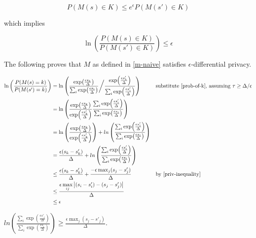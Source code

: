 \documentclass{article}
\begin{document}
\begin{equation}
    P(M(s) \in K) \leq e^\epsilon P(M(s') \in K)
\end{equation}

which implies

\begin{equation}
    \label{ln-defn}
    \ln\left(\frac{P(M(s) \in K)}{P(M(s') \in K)}\right)  \leq \epsilon
\end{equation}

The following proves that $M$ as defined in \ref{m-naive} satisfies $\epsilon$-differential privacy.

\begin{align*}
    \ln\left(\frac{P(M(s) = k)}{P(M(s') = k)}\right) &= \ln \left(
        \frac
            {\exp(\frac{\epsilon s_k}{\Delta})}
            {\sum_{i} \exp(\frac{\epsilon s_i}{\Delta})
        }
        \bigg/ \frac
            {\exp(\frac{\epsilon s'_k}{\Delta})}
            {\sum_{i} \exp(\frac{\epsilon s'_i}{\Delta})} \right)
        &&\text{substitute \ref{prob-of-k}, assuming } \tau \geq \Delta / \epsilon \\
    &= \ln \left(\frac
        {\exp(\frac{\epsilon s_k}{\Delta})}{\exp(\frac{\epsilon s'_k}{\Delta})}
        \frac{\sum_{i} \exp(\frac{\epsilon s'_i}{\Delta})}{\sum_{i} \exp(\frac{\epsilon s_i}{\Delta})}\right) \\
    &= \ln \left(\frac
        {\exp(\frac{\epsilon s_k}{\Delta})}{\exp(\frac{\epsilon s'_k}{\Delta})}\right) + ln \left(
        \frac{\sum_{i} \exp(\frac{\epsilon s'_i}{\Delta})}{\sum_{i} \exp(\frac{\epsilon s_i}{\Delta})}\right) \\
    &= \frac{\epsilon (s_k - s'_k)}{\Delta} 
        + ln\left(\frac{\sum_{i} \exp(\frac{\epsilon s'_i}{\Delta})}{\sum_{i} \exp(\frac{\epsilon s_i}{\Delta})}\right) \\
    &\leq \frac{\epsilon (s_k - s'_k)}{\Delta} + \frac{-\epsilon \max_j (s_j - s'_j)}{\Delta} &&\text{by \ref{priv-inequality}} \\
    &\leq \frac{\epsilon\max\limits_{ij} \abs{(s_i - s'_i) - (s_j - s'_j)}}{\Delta} \\
    &\leq \epsilon
\end{align*}

\begin{lemma}
    \label{priv-inequality}
    $ln\left(\frac{\sum_{i} \exp(\frac{\epsilon s'_i}{\Delta})}{\sum_{i} \exp(\frac{\epsilon s_i}{\Delta})}\right) \geq \frac{\epsilon \max_j (s_j - s'_j)}{\Delta}$.
\end{lemma}
\end{document}
